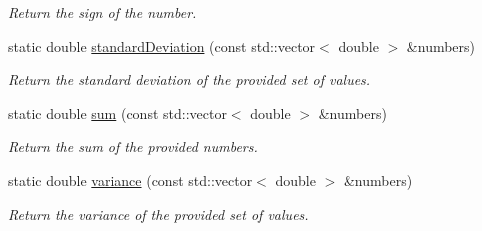 \begin{DoxyCompactItemize}
\begin{DoxyCompactList}\small\item\em Return the sign of the number. \end{DoxyCompactList}\item 
static double \hyperlink{classmultiscale_1_1Numeric_aa842f3143ada026759ec0474816c97ae}{standard\-Deviation} (const std\-::vector$<$ double $>$ \&numbers)
\begin{DoxyCompactList}\small\item\em Return the standard deviation of the provided set of values. \end{DoxyCompactList}\item 
static double \hyperlink{classmultiscale_1_1Numeric_aca9366c38b9b992793dd364b8e421bbd}{sum} (const std\-::vector$<$ double $>$ \&numbers)
\begin{DoxyCompactList}\small\item\em Return the sum of the provided numbers. \end{DoxyCompactList}\item 
static double \hyperlink{classmultiscale_1_1Numeric_a91bf7963069d7a51f01dff965508039c}{variance} (const std\-::vector$<$ double $>$ \&numbers)
\begin{DoxyCompactList}\small\item\em Return the variance of the provided set of values. \end{DoxyCompactList}\end{DoxyCompactItemize}
